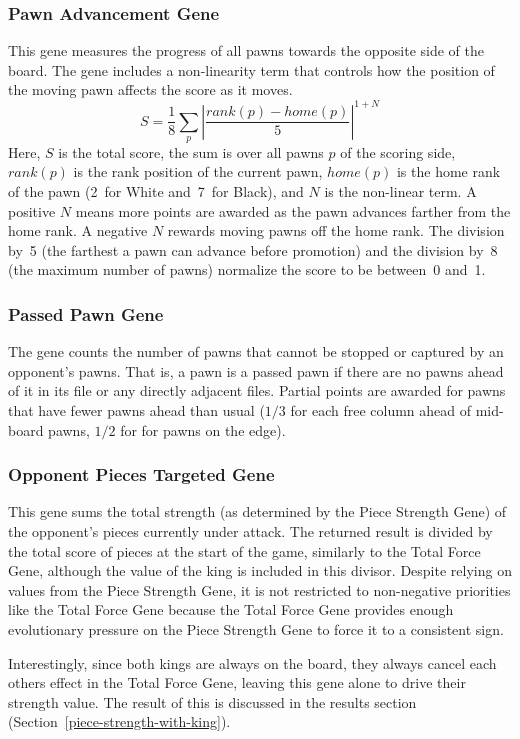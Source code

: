 \documentclass[letterpaper]{article}
\renewcommand{\_}{\allowbreak\textunderscore\allowbreak}
\begin{document}
\subsubsection{Pawn Advancement Gene}
This gene measures the progress of all pawns towards the opposite side of the board. The gene includes a non-linearity term that controls how the position of the moving pawn affects the score as it moves.
\[S = \frac{1}{8}\sum_p \left|\frac{rank(p) - home(p)}{5}\right|^{1 + N}\]
Here, \(S\) is the total score, the sum is over all pawns \(p\) of the scoring side, \(rank(p)\) is the rank position of the current pawn, \(home(p)\) is the home rank of the pawn (2~for White and~7~for Black), and \(N\) is the non-linear term. A positive \(N\) means more points are awarded as the pawn advances farther from the home rank. A negative \(N\) rewards moving pawns off the home rank. The division by~5 (the farthest a pawn can advance before promotion) and the division by~8 (the maximum number of pawns) normalize the score to be between~0 and~1.

\subsubsection{Passed Pawn Gene}
The gene counts the number of pawns that cannot be stopped or captured by an opponent's pawns. That is, a pawn is a passed pawn if there are no pawns ahead of it in its file or any directly adjacent files. Partial points are awarded for pawns that have fewer pawns ahead than usual (\(1/3\) for each free column ahead of mid-board pawns, \(1/2\) for for pawns on the edge).

\subsubsection{Opponent Pieces Targeted Gene}\label{opponent-pieces-targeted}
This gene sums the total strength (as determined by the Piece Strength Gene) of the opponent's pieces currently under attack. The returned result is divided by the total score of pieces at the start of the game, similarly to the Total Force Gene, although the value of the king is included in this divisor. Despite relying on values from the Piece Strength Gene, it is not restricted to non-negative priorities like the Total Force Gene because the Total Force Gene provides enough evolutionary pressure on the Piece Strength Gene to force it to a consistent sign.

Interestingly, since both kings are always on the board, they always cancel each others effect in the Total Force Gene, leaving this gene alone to drive their strength value. The result of this is discussed in the results section (Section~\ref{piece-strength-with-king}).
\end{document}
